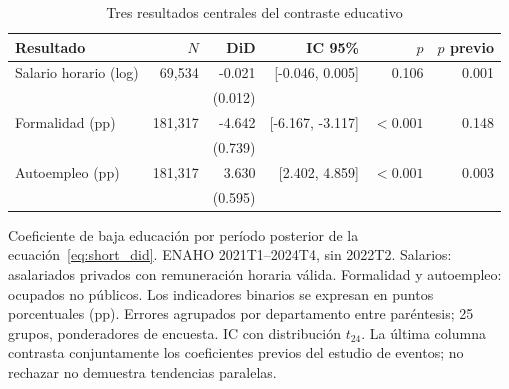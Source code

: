 \begin{table}[!htbp]\centering
\caption{Tres resultados centrales del contraste educativo}\label{tab:short_main}
\begin{threeparttable}\small
\setlength{\tabcolsep}{4pt}
\begin{tabular}{lrrrrr}
\toprule
Resultado & $N$ & DiD & IC 95\% & $p$ & $p$ previo \\
\midrule
Salario horario (log) & 69,534 & -0.021 & [-0.046, 0.005] & 0.106 & 0.001 \\
 &  & (0.012) &  &  &  \\
Formalidad (pp) & 181,317 & -4.642 & [-6.167, -3.117] & $<0.001$ & 0.148 \\
 &  & (0.739) &  &  &  \\
Autoempleo (pp) & 181,317 & 3.630 & [2.402, 4.859] & $<0.001$ & 0.003 \\
 &  & (0.595) &  &  &  \\
\bottomrule
\end{tabular}
\begin{tablenotes}\footnotesize
\item Coeficiente de baja educación por período posterior de la ecuación~\eqref{eq:short_did}. ENAHO 2021T1--2024T4, sin 2022T2. Salarios: asalariados privados con remuneración horaria válida. Formalidad y autoempleo: ocupados no públicos. Los indicadores binarios se expresan en puntos porcentuales (pp). Errores agrupados por departamento entre paréntesis; 25 grupos, ponderadores de encuesta. IC con distribución $t_{24}$. La última columna contrasta conjuntamente los coeficientes previos del estudio de eventos; no rechazar no demuestra tendencias paralelas.
\end{tablenotes}
\end{threeparttable}\end{table}
